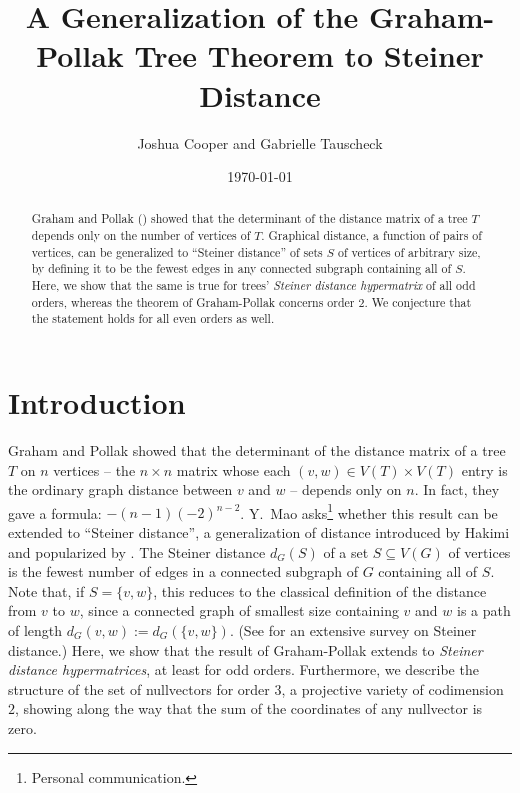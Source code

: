 \documentclass{article}
\title{A Generalization of the Graham-Pollak Tree Theorem to Steiner Distance}
\author{Joshua Cooper and Gabrielle Tauscheck}
\date{\today}
\begin{document}
\maketitle

\begin{abstract}
Graham and Pollak (\cite{GraPol71}) showed that the determinant of the distance matrix of a tree $T$ depends only on the number of vertices of $T$.  Graphical distance, a function of pairs of vertices, can be generalized to ``Steiner distance'' of sets $S$ of vertices of arbitrary size, by defining it to be the fewest edges in any connected subgraph containing all of $S$.  Here, we show that the same is true for trees' {\em Steiner distance hypermatrix} of all odd orders, whereas the theorem of Graham-Pollak concerns order $2$.  We conjecture that the statement holds for all even orders as well.
\end{abstract}

\section{Introduction}


Graham and Pollak showed that the determinant of the distance matrix of a tree $T$ on $n$ vertices -- the $n \times n$ matrix whose each $(v,w) \in V(T)\times V(T)$ entry is the ordinary graph distance between $v$ and $w$ -- depends only on $n$.  In fact, they gave a formula: $-(n-1)(-2)^{n-2}$.  Y.~Mao asks\footnote{Personal communication.} whether this result can be extended to ``Steiner distance'', a generalization of distance introduced by Hakimi \cite{Hak71} and popularized by \cite{ChaOelTiaZou89}. The Steiner distance $d_G(S)$ of a set $S \subseteq V(G)$ of vertices is the fewest number of edges in a connected subgraph of $G$ containing all of $S$.  Note that, if $S = \{v,w\}$, this reduces to the classical definition of the distance from $v$ to $w$, since a connected graph of smallest size containing $v$ and $w$ is a path of length $d_G(v,w) := d_G(\{v,w\})$. (See \cite{Mao17} for an extensive survey on Steiner distance.)  Here, we show that the result of Graham-Pollak extends to {\em Steiner distance hypermatrices}, at least for odd orders.  Furthermore, we describe the structure of the set of nullvectors for order $3$, a projective variety of codimension $2$, showing along the way that the sum of the coordinates of any nullvector is zero.
\end{document}
